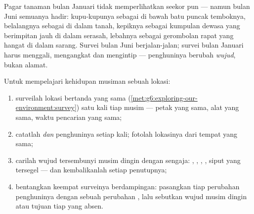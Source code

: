 \begin{example}\label{ex:g6:life-through-seasons:insects}
Pagar tanaman bulan Januari tidak memperlihatkan seekor  pun
--- namun  bulan Juni semuanya hadir: kupu-kupunya sebagai
 di bawah batu puncak temboknya, belalangnya sebagai  di
dalam tanah, kepiknya sebagai kumpulan dewasa yang  berimpitan
jauh di dalam serasah, lebahnya sebagai gerombolan rapat yang hangat
di dalam sarang. Survei bulan Juni berjalan-jalan; survei bulan
Januari harus menggali, mengangkat dan mengintip --- penghuninya
berubah \emph{wujud}, bukan alamat.
\end{example}

\begin{method}\label{met:g6:life-through-seasons:yearsurvey}
Untuk mempelajari kehidupan musiman sebuah lokasi:
\begin{enumerate}
  \item surveilah lokasi bertanda yang sama
        (\cref{met:g6:exploring-our-environment:survey})
        satu kali tiap musim --- petak yang sama, alat yang sama,
        waktu pencarian yang sama;
  \item catatlah  \emph{dan} penghuninya setiap kali;
        fotolah lokasinya dari tempat yang sama;
  \item carilah wujud tersembunyi musim dingin dengan sengaja:
        , , , , siput yang tersegel ---
        dan kembalikanlah setiap penutupnya;
  \item bentangkan keempat surveinya berdampingan: pasangkan tiap
        perubahan penghuninya dengan sebuah perubahan , lalu
        sebutkan wujud musim dingin atau tujuan tiap yang absen.
\end{enumerate}
\end{method}

